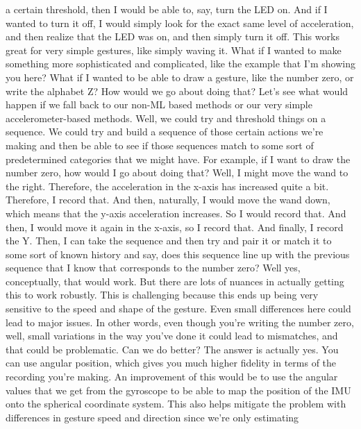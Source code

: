     a certain threshold, then I would be able to, say, turn the LED on.
    And if I wanted to turn it off, I would simply
    look for the exact same level of acceleration,
    and then realize that the LED was on, and then simply turn it off.
    This works great for very simple gestures, like simply waving it.
    What if I wanted to make something more sophisticated and complicated,
    like the example that I'm showing you here?
    What if I wanted to be able to draw a gesture, like the number zero,
    or write the alphabet Z?
    How would we go about doing that?
    Let's see what would happen if we fall back
    to our non-ML based methods or our very simple accelerometer-based methods.
    Well, we could try and threshold things on a sequence.
    We could try and build a sequence of those certain actions we're making
    and then be able to see if those sequences match
    to some sort of predetermined categories that we might have.
    For example, if I want to draw the number zero,
    how would I go about doing that?
    Well, I might move the wand to the right.
    Therefore, the acceleration in the x-axis has increased quite a bit.
    Therefore, I record that.
    And then, naturally, I would move the wand down,
    which means that the y-axis acceleration increases.
    So I would record that.
    And then, I would move it again in the x-axis, so I record that.
    And finally, I record the Y.
    Then, I can take the sequence and then try and pair it or match it
    to some sort of known history and say, does this sequence
    line up with the previous sequence that I know that corresponds to the number
    zero?
    Well yes, conceptually, that would work.
    But there are lots of nuances in actually getting this to work robustly.
    This is challenging because this ends up being very sensitive to the speed
    and shape of the gesture.
    Even small differences here could lead to major issues.
    In other words, even though you're writing the number zero,
    well, small variations in the way you've done it could lead to mismatches,
    and that could be problematic.
    Can we do better?
    The answer is actually yes.
    You can use angular position, which gives you much higher fidelity in terms
    of the recording you're making.
    An improvement of this would be to use the angular values
    that we get from the gyroscope to be able to map the position of the IMU
    onto the spherical coordinate system.
    This also helps mitigate the problem with differences in gesture speed
    and direction since we're only estimating
